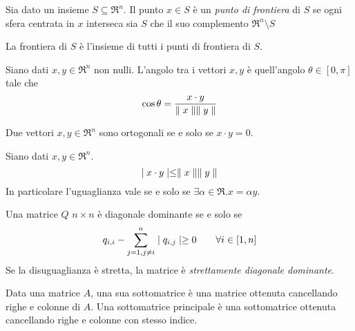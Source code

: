 \begin{definition}
	\label{dfn:set-frontier}
	Sia dato un insieme $S\subseteq\Re^{n}$. Il punto $x\in S$ è un \textit{punto di frontiera} di $S$ se ogni sfera centrata in $x$ interseca sia $S$ che il suo complemento $\Re^{n} \setminus S$

	La frontiera di $S$ è l'insieme di tutti i punti di frontiera di $S$.
\end{definition}

\begin{definition}
	\label{dfn:vector-angle}
	Siano dati $x,y\in\Re^{n}$ non nulli. L'angolo tra i vettori $x,y$ è quell'angolo $\theta\in [0,\pi]$ tale che
	\begin{equation}
		\label{eqn:vector-angle}
		\cos\theta=\frac{x\cdot y}{\parallel x \parallel\parallel y \parallel}
	\end{equation}
\end{definition}

\begin{definition}
	Due vettori $x,y\in\Re^{n}$ sono ortogonali se e solo se $x\cdot y=0$.
\end{definition}

\begin{theorem}
	\label{thm:disequality-cauchy-schwarz}
	Siano dati $x,y\in\Re^{n}$.
	\begin{equation}
		\label{eqn:disequality-cauchy-schwarz}
		\mid x\cdot y \mid\leq\parallel x \parallel\parallel y \parallel
	\end{equation}
	In particolare l'uguaglianza vale se e solo se $\exists\alpha\in\Re.x=\alpha y$.
\end{theorem}

\begin{definition}
	\label{dfn:diagonal-dominant-matrix}
	Una matrice $Q$ $n\times n$ è diagonale dominante se e solo se
	\begin{equation}
		\label{eqn:diagonal-dominant-matrix}
		q_{i,i}-\sum_{j=1,j\neq i}^{n}\mid q_{i,j} \mid\geq 0 \qquad \forall i\in[1,n]
	\end{equation}
	Se la disuguaglianza è stretta, la matrice è \textit{strettamente diagonale dominante}.
\end{definition}

\begin{definition}[Sottomatrice]
	\label{dfn:submatrix}
	Data una matrice $A$, una sua sottomatrice è una matrice ottenuta cancellando righe e colonne di $A$.
	Una sottomatrice principale è una sottomatrice ottenuta cancellando righe e colonne con stesso indice.
\end{definition}

